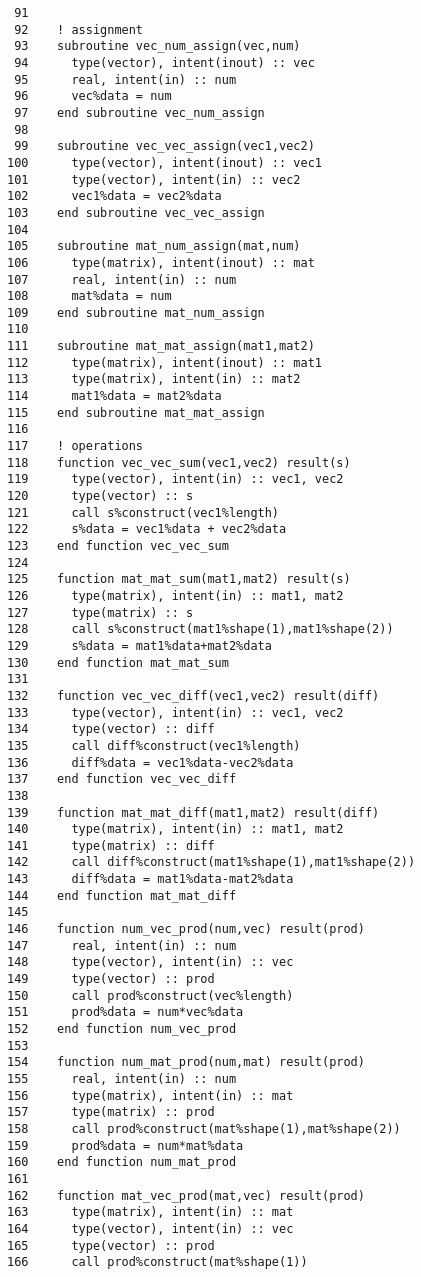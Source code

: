 \documentclass[11pt]{article}
\begin{document}
\begin{verbatim}
 91  
 92    ! assignment
 93    subroutine vec_num_assign(vec,num)
 94      type(vector), intent(inout) :: vec
 95      real, intent(in) :: num
 96      vec%data = num
 97    end subroutine vec_num_assign
 98  
 99    subroutine vec_vec_assign(vec1,vec2)
100      type(vector), intent(inout) :: vec1
101      type(vector), intent(in) :: vec2
102      vec1%data = vec2%data
103    end subroutine vec_vec_assign
104  
105    subroutine mat_num_assign(mat,num)
106      type(matrix), intent(inout) :: mat
107      real, intent(in) :: num
108      mat%data = num
109    end subroutine mat_num_assign
110  
111    subroutine mat_mat_assign(mat1,mat2)
112      type(matrix), intent(inout) :: mat1
113      type(matrix), intent(in) :: mat2
114      mat1%data = mat2%data
115    end subroutine mat_mat_assign
116  
117    ! operations
118    function vec_vec_sum(vec1,vec2) result(s)
119      type(vector), intent(in) :: vec1, vec2
120      type(vector) :: s
121      call s%construct(vec1%length)
122      s%data = vec1%data + vec2%data
123    end function vec_vec_sum
124  
125    function mat_mat_sum(mat1,mat2) result(s)
126      type(matrix), intent(in) :: mat1, mat2
127      type(matrix) :: s
128      call s%construct(mat1%shape(1),mat1%shape(2))
129      s%data = mat1%data+mat2%data
130    end function mat_mat_sum
131  
132    function vec_vec_diff(vec1,vec2) result(diff)
133      type(vector), intent(in) :: vec1, vec2
134      type(vector) :: diff
135      call diff%construct(vec1%length)
136      diff%data = vec1%data-vec2%data
137    end function vec_vec_diff
138  
139    function mat_mat_diff(mat1,mat2) result(diff)
140      type(matrix), intent(in) :: mat1, mat2
141      type(matrix) :: diff
142      call diff%construct(mat1%shape(1),mat1%shape(2))
143      diff%data = mat1%data-mat2%data
144    end function mat_mat_diff
145  
146    function num_vec_prod(num,vec) result(prod)
147      real, intent(in) :: num
148      type(vector), intent(in) :: vec
149      type(vector) :: prod
150      call prod%construct(vec%length)
151      prod%data = num*vec%data
152    end function num_vec_prod
153  
154    function num_mat_prod(num,mat) result(prod)
155      real, intent(in) :: num
156      type(matrix), intent(in) :: mat
157      type(matrix) :: prod
158      call prod%construct(mat%shape(1),mat%shape(2))
159      prod%data = num*mat%data
160    end function num_mat_prod
161  
162    function mat_vec_prod(mat,vec) result(prod)
163      type(matrix), intent(in) :: mat
164      type(vector), intent(in) :: vec
165      type(vector) :: prod
166      call prod%construct(mat%shape(1))

\end{verbatim}
\end{document}
